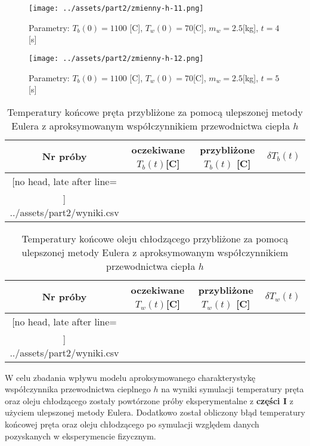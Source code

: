 \documentclass[
	12pt, %
]{fphw}
\begin{document}
\begin{figure}[H]
	\texttt{[image: ../assets/part2/zmienny-h-11.png]}
	\caption{Parametry: \(T_b(0) = 1100\) [\textdegree{}C], \(T_w(0) = 70\)[\textdegree{}C], \(m_w = 2.5\)[kg], \(t = 4\)[s]}

	\texttt{[image: ../assets/part2/zmienny-h-12.png]}
	\caption{Parametry: \(T_b(0) = 1100\) [\textdegree{}C], \(T_w(0) = 70\)[\textdegree{}C], \(m_w = 2.5\)[kg], \(t = 5\)[s]}
\end{figure}

\begin{table}[H]
	\begin{tabular}{|c|c|c|c|}\hline%
	Nr próby & oczekiwane \(T_b(t)\)[\textdegree{}C] & przybliżone \(T_b(t)\) [\textdegree{}C] & \(\delta T_b(t)\) \\\hline
	\csvreader[no head, late after line=\\\hline]%
	{../assets/part2/wyniki.csv}{}%
	{\thecsvrow&\csvcoli&\csvcoliii&\csvcoliv}%
	\end{tabular}
	\caption{Temperatury końcowe pręta przybliżone za pomocą ulepszonej metody Eulera z aproksymowanym współczynnikiem przewodnictwa ciepła \(h\)}
	\label{tab:approx-wyniki-1}
\end{table}

\begin{table}[H]
	\begin{tabular}{|c|c|c|c|}\hline%
	Nr próby & oczekiwane \(T_w(t)\)[\textdegree{}C] & przybliżone \(T_w(t)\) [\textdegree{}C] & \(\delta T_w(t)\) \\\hline
	\csvreader[no head, late after line=\\\hline]%
	{../assets/part2/wyniki.csv}{}%
	{\thecsvrow&\csvcolii&\csvcolv&\csvcolvi}%
	\end{tabular}
	\caption{Temperatury końcowe oleju chłodzącego przybliżone za pomocą ulepszonej metody Eulera z aproksymowanym współczynnikiem przewodnictwa ciepła \(h\)}
	\label{tab:approx-wyniki-2}
\end{table}

W celu zbadania wpływu modelu aproksymowanego charakterystykę współczynnika przewodnictwa cieplnego \(h\) na wyniki symulacji
temperatury pręta oraz oleju chłodzącego zostały powtórzone próby eksperymentalne z \textbf{części I}
z użyciem ulepszonej metody Eulera.
Dodatkowo został obliczony błąd temperatury końcowej pręta oraz oleju chłodzącego po symulacji
względem danych pozyskanych w eksperymencie fizycznym.
\end{document}
